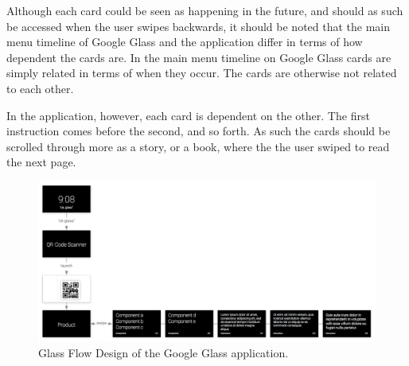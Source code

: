 Although each card could be seen as happening in the future, and should as such be accessed when the user swipes backwards, it should be noted that the main menu timeline of Google Glass and the application differ in terms of how dependent the cards are. In the main menu timeline on Google Glass cards are simply related in terms of when they occur. The cards are otherwise not related to each other.

In the application, however, each card is dependent on the other. The first instruction comes before the second, and so forth. As such the cards should be scrolled through more as a story, or a book, where the the user swiped to read the next page.

	\begin{figure}[ht!]
		\centering
		\includegraphics[width=150mm]{images/glaswareFlowDesignerScreenshot}
		\caption{Glass Flow Design of the Google Glass application.}
		\label{glassFlowDesign}
	\end{figure}